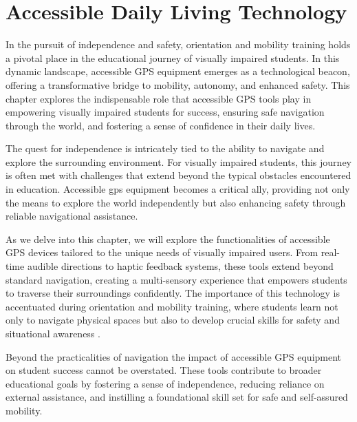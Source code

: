 \chapter{Accessible Daily Living Technology}\label{ch8:chap:accessible-daily-living}
\raggedright
In the pursuit of independence and safety, orientation and mobility training holds a pivotal place in the educational journey of visually impaired students. In this dynamic landscape, accessible GPS equipment emerges as a technological beacon, offering a transformative bridge to mobility, autonomy, and enhanced safety. This chapter explores the indispensable role that accessible GPS tools play in empowering visually impaired students for success, ensuring safe navigation through the world, and fostering a sense of confidence in their daily lives.\supercite{OrientationMobilityInstruction, AFBGPS2023}

The quest for \gls{independence} is intricately tied to the ability to navigate and explore the surrounding environment. For visually impaired students, this journey is often met with challenges that extend beyond the typical obstacles encountered in education. Accessible \gls{gps} equipment becomes a critical ally, providing not only the means to explore the world independently but also enhancing \gls{safety} through reliable navigational assistance.\supercite{Holbrook2006, Kelly2011}

As we delve into this chapter, we will explore the functionalities of accessible GPS devices tailored to the unique needs of visually impaired users. From real-time audible directions to haptic feedback systems, these tools extend beyond standard navigation, creating a multi-sensory experience that empowers students to traverse their surroundings confidently.\supercite{WeWALK, bipedai} The importance of this technology is accentuated during orientation and mobility training, where students learn not only to navigate physical spaces but also to develop crucial skills for safety and situational awareness \supercite{OrientationMobilityInstruction}.

Beyond the practicalities of navigation the impact of accessible GPS equipment on student success cannot be overstated. These tools contribute to broader educational goals by fostering a sense of independence, reducing reliance on external assistance, and instilling a foundational skill set for safe and self-assured mobility.\supercite{StudentOutcomesResearch, wjaets2024}

